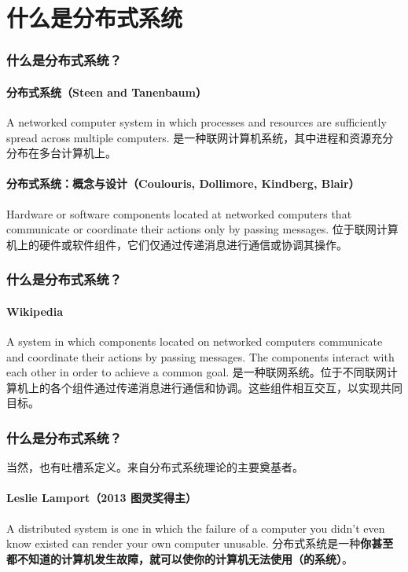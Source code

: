 \section{什么是分布式系统}

\subsubsection*{什么是分布式系统？}

\paragraph{分布式系统（Steen and Tanenbaum）}
A networked computer system in which processes and resources are sufficiently spread across multiple computers.
是一种联网计算机系统，其中进程和资源充分分布在多台计算机上。

\paragraph{分布式系统：概念与设计（Coulouris, Dollimore, Kindberg, Blair）}
Hardware or software components located at networked computers that communicate or coordinate their actions only by passing messages.
位于联网计算机上的硬件或软件组件，它们仅通过传递消息进行通信或协调其操作。

\subsubsection*{什么是分布式系统？}

\paragraph{Wikipedia}
A system in which components located on networked computers communicate and coordinate their actions by passing messages. The components interact with each other in order to achieve a common goal.
是一种联网系统。位于不同联网计算机上的各个组件通过传递消息进行通信和协调。这些组件相互交互，以实现共同目标。

\subsubsection*{什么是分布式系统？}

当然，也有吐槽系定义。来自分布式系统理论的主要奠基者。

\paragraph{Leslie Lamport（2013 图灵奖得主）}
A distributed system is one in which the failure of a computer you didn't even know existed can render your own computer unusable.
分布式系统是一种\textbf{你甚至都不知道的计算机发生故障，就可以使你的计算机无法使用（的系统）}。

